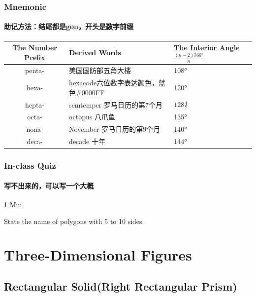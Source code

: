 \documentclass[
	11pt, %
]{beamer}
\begin{document}
\begin{frame}
	\frametitle{Mnemonic} %
	\framesubtitle{助记方法：结尾都是gon，开头是数字前缀}
	\begin{table}
		\begin{tabularx}{350pt}{c X X}
			\toprule
			\textbf{The Number Prefix} & \textbf{Derived Words} & \textbf{The Interior Angle $\frac{(n-2)\ang{360}}{n}$}\\
			\midrule
			penta- & 美国国防部五角大楼 & \ang{108}\\
			\midrule
			hexa- & hexacode六位数字表达颜色，蓝色\#0000FF & \ang{120}\\
			\midrule
			hepta- & semtemper 罗马日历的第7个月 & $128\frac{4}{7}$\textdegree\\
			\midrule
			octa- & octopus 八爪鱼 & \ang{135}\\
			\midrule
			nona- & November 罗马日历的第9个月 & \ang{140}\\
			\midrule
			deca- & decade 十年 & \ang{144}\\
			\bottomrule
		\end{tabularx}
	\end{table}
\end{frame}




\begin{frame}%
\frametitle{In-class Quiz}
\framesubtitle{写不出来的，可以写一个大概}
	\begin{center}
		{\Huge 1 Min}
		\bigskip\bigskip %
		
		{\LARGE State the name of polygons with 5 to 10 sides.}
	\end{center}
\end{frame}




\section{Three-Dimensional Figures}


\subsection{Rectangular Solid(Right Rectangular Prism)}
\end{document}
